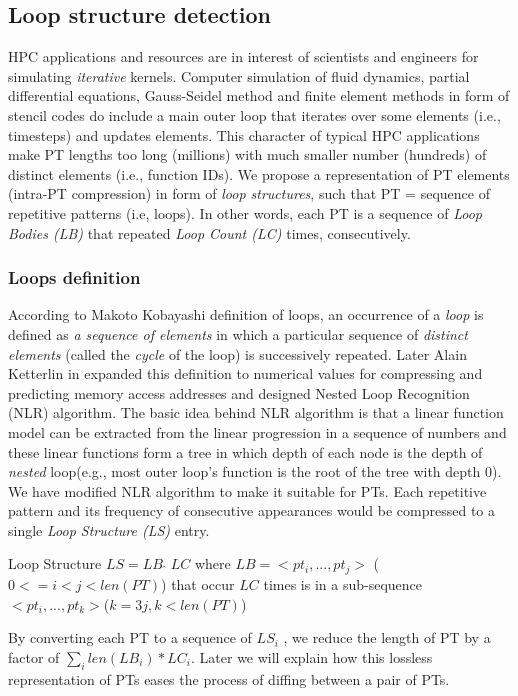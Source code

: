 \subsection{Loop structure detection}
\label{subsec:nlr}

HPC applications and resources are in interest of scientists and engineers for simulating \textit{iterative} kernels. Computer simulation of fluid dynamics, partial differential equations, Gauss-Seidel method and finite element methods in form of stencil codes do include a main outer loop that iterates over some elements (i.e., timesteps) and updates elements.
%
This character of typical HPC applications make PT lengths too long (millions) with much smaller number (hundreds) of distinct elements  (i.e., function IDs).
%
We propose a representation of PT elements (intra-PT compression) in form of \textit{loop structures}, such that PT = sequence of repetitive patterns (i.e, loops). In other words, each PT is a sequence of \textit{Loop Bodies (LB)} that repeated \textit{Loop Count (LC)} times, consecutively.
%


\subsubsection{Loops definition}

According to Makoto Kobayashi\cite{kobayashi-84} definition of loops, an occurrence of a \textit{loop} is defined as \textit{a sequence of elements} in which a particular sequence of \textit{distinct elements} (called the \textit{cycle} of the loop) is successively repeated. 
%
Later Alain Ketterlin in \cite{Ketterlin-nlr} expanded this definition to numerical values for compressing and predicting memory access addresses and designed Nested Loop Recognition (NLR) algorithm.
%
The basic idea behind NLR algorithm is that a linear function model can be extracted from the linear progression in a sequence of numbers and these linear functions form a tree in which depth of each node is the depth of \textit{nested} loop(e.g., most outer loop's function is the root of the tree with depth 0). 
%
We have modified NLR algorithm to make it suitable for PTs.
%
Each repetitive pattern and its frequency of consecutive appearances would be compressed to a single \textit{Loop Structure (LS)} entry.
%
\begin{definition}{Loop Structure} $LS = LB \; \hat{} \; LC$ where $LB  = <pt_i,...,pt_j>$ ($0<= i < j < len(PT)$) that occur $LC$ times is in a sub-sequence $ <pt_i,...,pt_k>$($k = 3j, k<len(PT)$) 

\end{definition}
%
By converting each PT to a sequence of $LS_i$ , we reduce the length of PT by a factor of $\sum_i len(LB_i) * LC_i$.
%
Later we will explain how this lossless representation of PTs eases the process of diffing between a pair of PTs.

